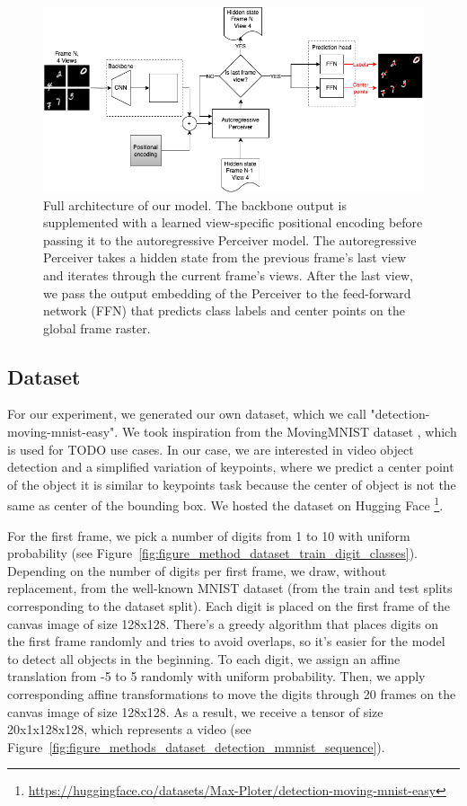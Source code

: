 \begin{figure}
    \centering
    \includegraphics[width=\textwidth]{figures/figure_methods_model_ar_perceiver_views.png}
    \caption{Full architecture of our model. The backbone output is supplemented with a learned view-specific positional encoding before passing it to the autoregressive Perceiver model. The autoregressive Perceiver takes a hidden state from the previous frame's last view and iterates through the current frame's views. After the last view, we pass the output embedding of the Perceiver to the feed-forward network (FFN) that predicts class labels and center points on the global frame raster.}
    \label{fig:figure_methods_model_r_perceiver_complte}
\end{figure}


\subsection{Dataset} \label{Methods:Dataset}

For our experiment, we generated our own dataset, which we call "detection-moving-mnist-easy". We took inspiration from the MovingMNIST dataset \cite{srivastava2016unsupervisedlearningvideorepresentations}, which is used for TODO use cases. In our case, we are interested in video object detection and a simplified variation of keypoints, where we predict a center point of the object it is similar to keypoints task because the center of object is not the same as center of the bounding box. We hosted the dataset on Hugging Face \footnote{\url{https://huggingface.co/datasets/Max-Ploter/detection-moving-mnist-easy}}.

 For the first frame, we pick a number of digits from 1 to 10 with uniform probability (see Figure~\ref{fig:figure_method_dataset_train_digit_classes}). Depending on the number of digits per first frame, we draw, without replacement, from the well-known MNIST dataset \cite{} (from the train and test splits corresponding to the dataset split). Each digit is placed on the first frame of the canvas image of size 128x128. There's a greedy algorithm that places digits on the first frame randomly and tries to avoid overlaps, so it's easier for the model to detect all objects in the beginning. To each digit, we assign an affine translation from -5 to 5 randomly with uniform probability. Then, we apply corresponding affine transformations to move the digits through 20 frames on the canvas image of size 128x128. As a result, we receive a tensor of size 20x1x128x128, which represents a video (see Figure~\ref{fig:figure_methods_dataset_detection_mmnist_sequence}).

